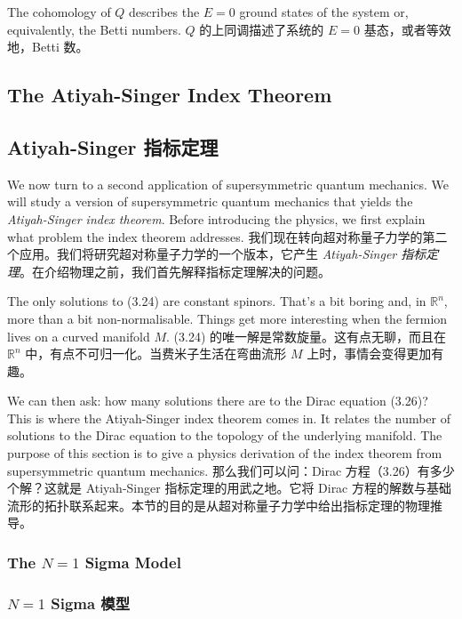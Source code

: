 \documentclass{article}
\begin{document}
\begin{paracol}{2}

The cohomology of $Q$ describes the $E = 0$ ground states of the system or, equivalently, the Betti numbers.
\switchcolumn
$Q$ 的上同调描述了系统的 $E = 0$ 基态，或者等效地，Betti 数。
\switchcolumn*

\subsection{The Atiyah-Singer Index Theorem}
\switchcolumn
\subsection*{Atiyah-Singer 指标定理}
\switchcolumn*

We now turn to a second application of supersymmetric quantum mechanics. We will study a version of supersymmetric quantum mechanics that yields the \textit{Atiyah-Singer index theorem}. Before introducing the physics, we first explain what problem the index theorem addresses.
\switchcolumn
我们现在转向超对称量子力学的第二个应用。我们将研究超对称量子力学的一个版本，它产生 \textit{Atiyah-Singer 指标定理}。在介绍物理之前，我们首先解释指标定理解决的问题。
\switchcolumn*

The only solutions to (3.24) are constant spinors. That’s a bit boring and, in $\mathbb{R}^n$, more than a bit non-normalisable. Things get more interesting when the fermion lives on a curved manifold $M$.
\switchcolumn
(3.24) 的唯一解是常数旋量。这有点无聊，而且在 $\mathbb{R}^n$ 中，有点不可归一化。当费米子生活在弯曲流形 $M$ 上时，事情会变得更加有趣。
\switchcolumn*

We can then ask: how many solutions there are to the Dirac equation (3.26)? This is where the Atiyah-Singer index theorem comes in. It relates the number of solutions to the Dirac equation to the topology of the underlying manifold. The purpose of this section is to give a physics derivation of the index theorem from supersymmetric quantum mechanics.
\switchcolumn
那么我们可以问：Dirac 方程（3.26）有多少个解？这就是 Atiyah-Singer 指标定理的用武之地。它将 Dirac 方程的解数与基础流形的拓扑联系起来。本节的目的是从超对称量子力学中给出指标定理的物理推导。
\switchcolumn*

\subsubsection{The $N = 1$ Sigma Model}
\switchcolumn
\subsubsection*{$N = 1$ Sigma 模型}
\switchcolumn*


\end{paracol}
\end{document}
